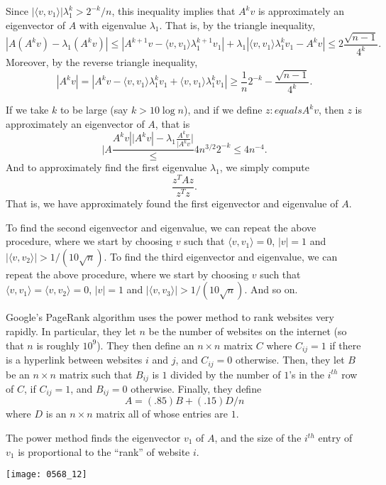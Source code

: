 \begin{remark} Since $|\langle v,v_{1}\rangle|\lambda_{1}^{k}>2^{-k}/n$, this inequality implies that $A^{k}v$ is approximately an eigenvector of $A$ with eigenvalue $\lambda_{1}$.  That is, by the triangle inequality,
$$|A(A^{k}v)-\lambda_{1}(A^{k}v)|
\leq|A^{k+1}v-\langle v,v_{1}\rangle\lambda_{1}^{k+1}v_{1}|
+\lambda_{1}|\langle v,v_{1}\rangle\lambda_{1}^{k}v_{1}-A^{k}v|\leq 2\frac{\sqrt{n-1}}{4^{k}}.$$
Moreover, by the reverse triangle inequality,
$$|A^{k}v|=|A^{k}v-\langle v,v_{1}\rangle\lambda_{1}^{k}v_{1}+\langle v,v_{1}\rangle\lambda_{1}^{k}v_{1}|
\geq\frac{1}{n}2^{-k}-\frac{\sqrt{n-1}}{4^{k}}.$$

If we take $k$ to be large (say $k>10\log n$), and if we define $z : equals A^{k}v$, then $z$ is approximately an eigenvector of $A$, that is
$$|A\frac{A^{k}v|{|A^{k}v}|-\lambda_{1}\frac{A^{k}v}{|A^{k}v}|}\leq 4n^{3/2}2^{-k}\leq 4n^{-4}.$$
And to approximately find the first eigenvalue $\lambda_{1}$, we simply compute
$$\frac{z^{T}Az}{z^{T}z}.$$
That is, we have approximately found the first eigenvector and eigenvalue of $A$.

To find the second eigenvector and eigenvalue, we can repeat the above procedure, where we start by choosing $v$ such that $\langle v,v_{1}\rangle=0$, $|v|=1$ and $|\langle v,v_{2}\rangle|>1/(10\sqrt{n})$.  To find the third eigenvector and eigenvalue, we can repeat the above procedure, where we start by choosing $v$ such that $\langle v,v_{1}\rangle=\langle v,v_{2}\rangle=0$, $|v|=1$ and $|\langle v,v_{3}\rangle|>1/(10\sqrt{n})$.  And so on.

Google's PageRank algorithm uses the power method to rank websites very rapidly.  In particular, they let $n$ be the number of websites on the internet (so that $n$ is roughly $10^{9}$).  They then define an $n\times n$ matrix $C$ where $C_{ij}=1$ if there is a hyperlink between websites $i$ and $j$, and $C_{ij}=0$ otherwise.  Then, they let $B$ be an $n\times n$ matrix such that $B_{ij}$ is $1$ divided by the number of $1$'s in the $i^{th}$ row of $C$, if $C_{ij}=1$, and $B_{ij}=0$ otherwise.  Finally, they define
$$A=(.85)B+(.15)D/n$$
where $D$ is an $n\times n$ matrix all of whose entries are $1$.

The power method finds the eigenvector $v_{1}$ of $A$, and the size of the $i^{th}$ entry of $v_{1}$ is proportional to the ``rank'' of website $i$.
\end{remark}

\texttt{[image: 0568\_12]}

